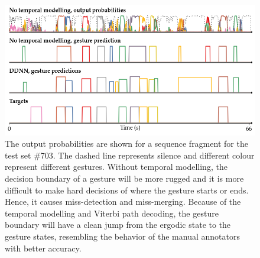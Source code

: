 \begin{figure}[t]
  \centering
  \includegraphics[width=.7\textwidth]{images/output.png}
  \caption{
  \small{The output probabilities are shown for a sequence fragment for the test set \#703. The dashed line represents silence and different colour represent different gestures. Without temporal modelling, the decision boundary of a gesture will be more rugged and it is more difficult to make hard decisions of where the gesture starts or ends. Hence, it causes miss-detection and miss-merging. Because of the temporal modelling and Viterbi path decoding, the gesture boundary will have a clean jump from the ergodic state to the gesture states, resembling the behavior of the manual annotators with better accuracy.}}
    \label{fig:temporalModellingComparision}
\end{figure}


